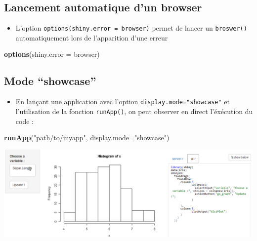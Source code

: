 \documentclass[]{article}
\newenvironment{Shaded}{\begin{snugshade}}{\end{snugshade}}
\newcommand{\KeywordTok}[1]{\textcolor[rgb]{0.13,0.29,0.53}{\textbf{#1}}}
\newcommand{\DataTypeTok}[1]{\textcolor[rgb]{0.13,0.29,0.53}{#1}}
\newcommand{\StringTok}[1]{\textcolor[rgb]{0.31,0.60,0.02}{#1}}
\newcommand{\NormalTok}[1]{#1}
\providecommand{\tightlist}{%
  \setlength{\itemsep}{0pt}\setlength{\parskip}{0pt}}
\begin{document}
\subsection{Lancement automatique d'un
browser}\label{lancement-automatique-dun-browser}

\begin{itemize}
\tightlist
\item
  L'option \texttt{options(shiny.error\ =\ browser)} permet de lancer un
  \texttt{broswer()} automatiquement lors de l'apparition d'une erreur
\end{itemize}

\begin{Shaded}
\begin{Highlighting}[]
\KeywordTok{options}\NormalTok{(}\DataTypeTok{shiny.error =}\NormalTok{ browser)}
\end{Highlighting}
\end{Shaded}

\subsection{\texorpdfstring{Mode
``showcase''}{Mode showcase}}\label{mode-showcase}

\begin{itemize}
\tightlist
\item
  En lançant une application avec l'option
  \texttt{display.mode="showcase"} et l'utilisation de la fonction
  \texttt{runApp()}, on peut observer en direct l'éxécution du code :
\end{itemize}

\begin{Shaded}
\begin{Highlighting}[]
\KeywordTok{runApp}\NormalTok{(}\StringTok{"path/to/myapp"}\NormalTok{, }\DataTypeTok{display.mode=}\StringTok{"showcase"}\NormalTok{)}
\end{Highlighting}
\end{Shaded}

\includegraphics{img/debug_showcase.png}
\end{document}
